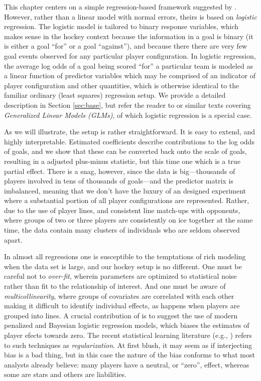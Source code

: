 This chapter centers on a simple regression-based framework suggested by
\cite{gramacy:jensen:taddy:2013}.  However, rather than a linear model
with normal errors, theirs is based on {\em logistic} regression.  The
logistic model is tailored to binary response variables, which makes sense in
the hockey context because the information in a goal is binary (it is either a
goal ``for'' or a goal ``against''), and because there there are very few goal
events observed for any particular player configuration.  In logistic
regression, the average log odds of a goal being scored ``for'' a particular
team  is modeled as a linear function of predictor variables which may be
comprised of an indicator of player configuration and other quantities, which
is otherwise identical to the familiar ordinary (least squares) regression
setup.  We provide a detailed description in Section \ref{sec:base}, but refer
the reader to \cite{sheather:2009} or similar texts covering {\em Generalized Linear
Models (GLMs)}, of which logistic regression is a special case.

As we will illustrate, the setup is rather straightforward.  It is easy to
extend, and highly interpretable.  Estimated coefficients describe
contributions to the log odds of goals, and we show that these can be
converted back onto the scale of goals, resulting in a adjusted plus-minus
statistic, but this time one which is a true partial effect.  There is a snag,
however, since the data is big---thousands of players involved in tens of
thousands of goals---and the predictor matrix is imbalanced, meaning that we
don't have the luxury of an designed experiment where a substantial portion of
all player configurations are represented.  Rather, due to the use of player
lines, and consistent line match-ups with opponents, where groups of two or
three players are consistently on ice together at the same time, the data
contain many clusters of individuals who are seldom observed apart. 

In almost all regressions one is susceptible to the temptations of rich
modeling when the data set is large, and our hockey setup is no different. One
must be careful not to {\em over-fit}, wherein parameters are optimized to
statistical noise rather than fit to the relationship of interest.  And one
must be aware of {\em multicollinearity}, where groups of covariates are
correlated with each other making it difficult to identify individual effects,
as happens when players are grouped into lines.  A crucial contribution of
\cite{gramacy:jensen:taddy:2013} is to suggest the use of modern penalized and
Bayesian logistic regression models, which biases the estimates of player
efects towards zero.  The recent statistical learning literature (e.g.,
\cite{hastie:tibsh:fried:2001}) refers to such techniques as {\em
regularization}.  At first blush, it may seem as if interjecting bias is a bad
thing, but in this case the nature of the bias conforms to what most analysts
already believe: many players have a neutral, or ``zero'', effect, whereas
some are stars and others are liabilities.  

